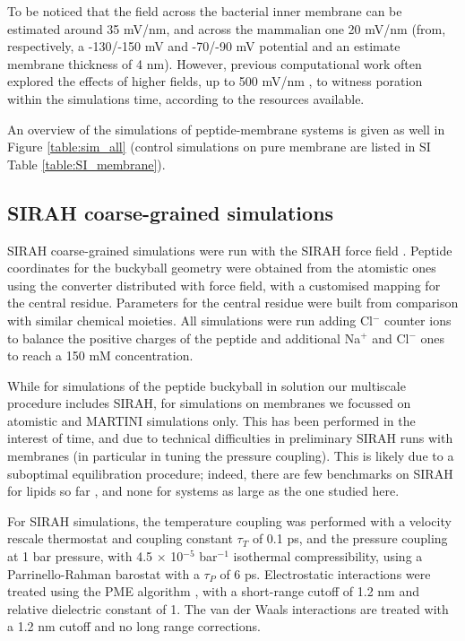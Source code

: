 To be noticed that the field across the bacterial inner membrane can be estimated around 35 mV/nm, and across the mammalian one 20 mV/nm (from, respectively, a -130/-150 mV and -70/-90 mV potential \citep{Yeaman2003,Wilson2011} and an estimate membrane thickness of 4 nm). However, previous computational work often explored the effects of higher fields, up to 500 mV/nm \citep{Tieleman2004, Bockmann2008, Piggot2011}, to witness poration within the simulations time, according to the resources available.

An overview of the simulations of peptide-membrane systems is given as well in Figure \ref{table:sim_all} (control simulations on pure membrane are listed in SI Table \ref{table:SI_membrane}).

\subsection{SIRAH coarse-grained simulations}
SIRAH coarse-grained simulations were run with the SIRAH force field \citep{Machado2018}. Peptide coordinates for the buckyball geometry were obtained from the atomistic ones using the converter distributed with force field, with a customised mapping for the central residue. Parameters for the central residue were built from comparison with similar chemical moieties. All simulations were run adding Cl$^-$ counter ions to balance the positive charges of the peptide and additional Na$^+$  and Cl$^-$ ones to reach a 150 mM concentration.

While for simulations of the peptide buckyball in solution our multiscale procedure includes SIRAH, for simulations on membranes we focussed on atomistic and MARTINI simulations only. This has been performed in the interest of time, and due to technical difficulties in preliminary SIRAH runs with membranes (in particular in tuning the pressure coupling).
%
This is likely due to a suboptimal equilibration procedure; indeed, there are few benchmarks on SIRAH for lipids so far \citep{Barrera2019}, and none for systems as large as the one studied here.

For SIRAH simulations, the temperature coupling was performed with a velocity rescale thermostat \citep{Bussi2007} and coupling constant $\tau _T$ of 0.1 ps, and the pressure coupling at 1 bar pressure, with 4.5 $\times$ 10$^{-5}$ bar$^{-1}$ isothermal compressibility, using a Parrinello-Rahman barostat \citep{Parrinello1981} with a $\tau _P$ of 6 ps. Electrostatic interactions were treated using the PME algorithm \citep{Essmann1995}, with a short-range cutoff of 1.2 nm and relative dielectric constant of 1. The van der Waals interactions are treated with a 1.2 nm cutoff and no long range corrections.

